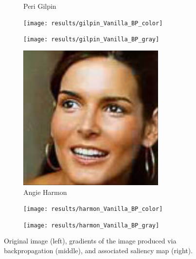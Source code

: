 \documentclass{article}
\begin{document}
\begin{figure}
\begin{subfigure}[t]{0.33\linewidth}
		\caption{Peri Gilpin}
	\end{subfigure}
	\begin{subfigure}[t]{0.33\linewidth}
		\texttt{[image: results/gilpin\_Vanilla\_BP\_color]}
	\end{subfigure}
	\begin{subfigure}[t]{0.33\linewidth}
		\texttt{[image: results/gilpin\_Vanilla\_BP\_gray]}
	\end{subfigure}\vspace{1em}
	\begin{subfigure}[t]{0.33\linewidth}
		\includegraphics[width=\linewidth]{most_harmon}
		\caption{Angie Harmon}
	\end{subfigure}
	\begin{subfigure}[t]{0.33\linewidth}
		\texttt{[image: results/harmon\_Vanilla\_BP\_color]}
	\end{subfigure}
	\begin{subfigure}[t]{0.33\linewidth}
		\texttt{[image: results/harmon\_Vanilla\_BP\_gray]}
	\end{subfigure}\vspace{1em}
	\caption{Original image (left), gradients of the image produced via backpropagation (middle), and associated saliency map (right).}
\end{figure}
\end{document}
